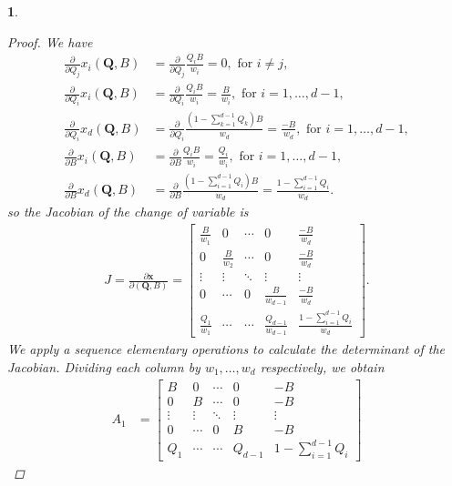 \documentclass[english]{article}
\numberwithin{equation}{section}
\numberwithin{figure}{section}
\theoremstyle{bolddescit}
\theoremstyle{definition}
\theoremstyle{definition}
\theoremstyle{plain}
\newtheorem{lemma}[theorem]{\protect\lemmaname}
\theoremstyle{plain}
\theoremstyle{bolddesc}
\theoremstyle{plain}
\theoremstyle{remark}
\providecommand{\lemmaname}{Lemma}
\begin{document}
\begin{lemma}
  \begin{proof}
    We have
    \begin{align*}
      \frac{\partial}{\partial Q_j} x_i(\mathbf{Q},B)
      &= \frac{\partial}{\partial Q_j} \frac{Q_i B}{w_i} = 0, \text{ for } i \neq j,\\
      \frac{\partial}{\partial Q_i} x_i(\mathbf{Q},B)
      &= \frac{\partial}{\partial Q_i} \frac{Q_i B}{w_i} = \frac{B}{w_i}, \text{ for } i = 1,\ldots,d-1,\\
      \frac{\partial}{\partial Q_i} x_d(\mathbf{Q},B)
      &= \frac{\partial}{\partial Q_i} \frac{(1-\sum_{k=1}^{d-1} Q_k) B}{w_d} = \frac{-B}{w_d}, \text{ for } i = 1,\ldots,d-1,\\
      \frac{\partial}{\partial B} x_i(\mathbf{Q},B)
      &= \frac{\partial}{\partial B} \frac{Q_i B}{w_i} = \frac{Q_i}{w_i}, \text{ for } i=1,\ldots,d-1,\\
      \frac{\partial}{\partial B} x_d(\mathbf{Q},B)
      &= \frac{\partial}{\partial B} \frac{(1-\sum_{i=1}^{d-1} Q_i) B}{w_d} = \frac{1-\sum_{i=1}^{d-1} Q_i}{w_d}.
    \end{align*}
    so the Jacobian of the change of variable is
    \begin{align*}
      J = \frac{\partial \mathbf{x}}{\partial (\mathbf{Q}, B)} = \begin{bmatrix}
        \frac{B}{w_1} & 0 & \cdots & 0 & \frac{-B}{w_d}\\
        0 & \frac{B}{w_2} & \cdots & 0 & \frac{-B}{w_d}\\
        \vdots & \vdots & \ddots & \vdots & \vdots\\
        0 & \cdots & 0 & \frac{B}{w_{d-1}} & \frac{-B}{w_d}\\
        \frac{Q_1}{w_1} & \cdots & \cdots & \frac{Q_{d-1}}{w_{d-1}} & \frac{1-\sum_{i=1}^{d-1} Q_i}{w_d}
      \end{bmatrix}.
    \end{align*}
    We apply a sequence elementary operations to calculate the determinant of the Jacobian. Dividing each column by $w_1, \ldots, w_d$ respectively, we obtain
    \begin{align*}
      A_1 &= \begin{bmatrix}
        B & 0 & \cdots & 0 & -B\\
        0 & B & \cdots & 0 & -B\\
        \vdots & \vdots & \ddots & \vdots & \vdots\\
        0 & \cdots & 0 & B & -B\\
        Q_1 & \cdots & \cdots & Q_{d-1} & 1-\sum_{i=1}^{d-1} Q_i

\end{bmatrix}
\end{align*}
\end{proof}
\end{lemma}
\end{document}
